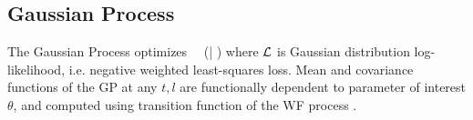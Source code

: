\subsection{Gaussian Process}
The Gaussian Process optimizes
\beq
\underset{\theta}{ \arg \max} \ \ \Lc(\bfX | \theta)
\eeq
where ${\cal L}$ is Gaussian distribution log-likelihood, i.e. negative weighted least-squares loss. Mean and covariance functions of the GP at any $t,l$ are functionally dependent to parameter of interest $\theta$, and computed using transition function of the WF process \cite{EandR-GP}.
